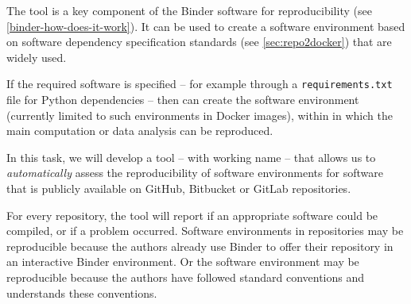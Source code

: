 \begin{task}[
  title=Towards quantifiable progress for reproducible software environments,
  id=repo2docker-checker,
  lead=SRL,
  PM=10,
  partners={MP}
  ]
  The \repotodocker{} tool is a key component of the Binder software for
  reproducibility (see \ref{binder-how-does-it-work}). It can be used to create
  a software environment based on software dependency specification standards
  (see \ref{sec:repo2docker}) that are widely used.

  If the required software is specified -- for example through a
  \texttt{requirements.txt} file for Python dependencies -- then \repotodocker{}
  can create the software environment (currently limited to such environments in
  Docker images), within in which the main computation or data analysis can be
  reproduced.

  In this task, we will develop a tool -- with working name
   -- that allows us to \emph{automatically}
  assess the reproducibility of software environments for software that is
  publicly available on GitHub, Bitbucket or GitLab repositories.

  For every repository, the  tool will report if an
  appropriate software could be compiled, or if a problem occurred. Software
  environments in repositories may be reproducible because the authors already
  use Binder to offer their repository in an interactive Binder environment. Or
  the software environment may be reproducible because the authors have followed
  standard conventions
  and \repotodocker{} understands these conventions.


\end{task}
